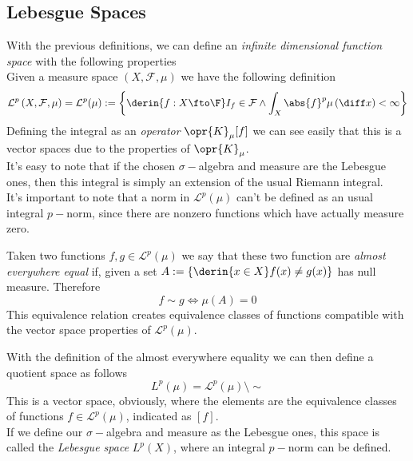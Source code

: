 \documentclass[../mmf.tex]{subfiles}
\begin{document}
\subsection{Lebesgue Spaces}
\begin{dfn}
	With the previous definitions, we can define an \textit{infinite dimensional function space} with the following properties\\
	Given a measure space $(X,\mathcal{F},\mu)$ we have the following definition
	\begin{equation}
		\mathcal{L}^p\left( X,\mathcal{F},\mu \right)=\mathcal{L}^p(\mu):=\left\{\derin{f: X\fto\F}I_f\in\mathcal{F}\wedge\int_{X}^{}\abs{f}^p\mu\left( \diff x \right)<\infty \right\}
		\label{eq:mcLpspaces}
	\end{equation}
	Defining the integral as an \textit{operator} $\opr{K}_\mu[f]$ we can see easily that this is a vector spaces due to the properties of $\opr{K}_\mu$.\\
	It's easy to note that if the chosen $\sigma-$algebra and measure are the Lebesgue ones, then this integral is simply an extension of the usual Riemann integral.\\
	It's important to note that a norm in $\mathcal{L}^p(\mu)$ can't be defined as an usual integral $p-$norm, since there are nonzero functions which have actually measure zero.
\end{dfn}
\begin{dfn}
	Taken two functions $f,g\in\mathcal{L}^p(\mu)$ we say that these two function are \textit{almost everywhere equal} if, given a set $A:=\{\derin{x\in X}f(x)\ne g(x)\}$ has null measure. Therefore
	\begin{equation}
		f\sim g\iff{}\mu(A)=0
		\label{eq:almosteverywhereeq}
	\end{equation}
	This equivalence relation creates equivalence classes of functions compatible with the vector space properties of $\mathcal{L}^p(\mu)$.
\end{dfn}
\begin{dfn}[$L^p$-Spaces]
	With the definition of the almost everywhere equality we can then define a quotient space as follows
	\begin{equation}
		L^p(\mu)=\mathcal{L}^p(\mu)\setminus\sim
		\label{eq:lspace}
	\end{equation}
	This is a vector space, obviously, where the elements are the equivalence classes of functions $f\in\mathcal{L}^p(\mu)$, indicated as $[f]$.\\
	If we define our $\sigma-$algebra and measure as the Lebesgue ones, this space is called the \textit{Lebesgue space} $L^p(X)$, where an integral $p-$norm can be defined.
\end{dfn}
\end{document}
